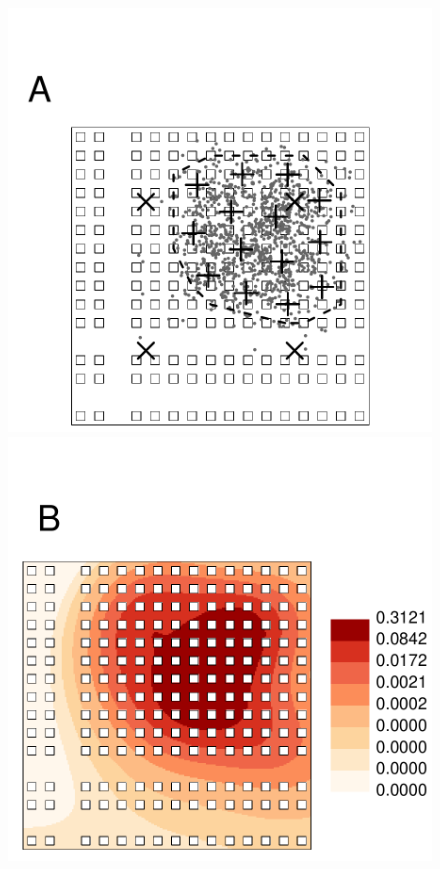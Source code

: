 \documentclass[12pt, titlepage]{article}\usepackage[]{graphicx}\usepackage[]{color}
\makeatletter
\def\maxwidth{ %
  \ifdim\Gin@nat@width>\linewidth
    \linewidth
  \else
    \Gin@nat@width
  \fi
}
\makeatother
\begin{document}
	\begin{figure}[H]
	\begin{center}
	\includegraphics[width = .50\maxwidth]{simulationExample} \\
	\includegraphics[width = .50\maxwidth]{simulationPlotsFittedSurface}

\end{center}
\end{figure}
\end{document}
